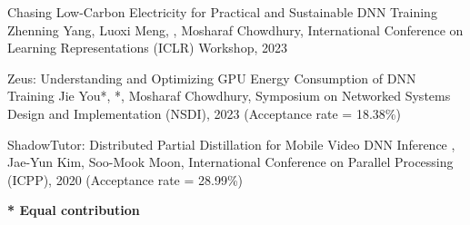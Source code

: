 



\begin{cvlist}

  \cvlistitem
    {Chasing Low-Carbon Electricity for Practical and Sustainable DNN Training} %
    {Zhenning Yang, Luoxi Meng, , Mosharaf Chowdhury, International Conference on Learning Representations (ICLR) Workshop, 2023} %

  \cvlistitem
    {Zeus: Understanding and Optimizing GPU Energy Consumption of DNN Training} %
    {Jie You*, *, Mosharaf Chowdhury, Symposium on Networked Systems Design and Implementation (NSDI), 2023 (Acceptance rate = 18.38\%)} %

  \cvlistitem
    {ShadowTutor: Distributed Partial Distillation for Mobile Video DNN Inference} %
    {, Jae-Yun Kim, Soo-Mook Moon, International Conference on Parallel Processing (ICPP), 2020 (Acceptance rate = 28.99\%)} %

\end{cvlist}

\vspace{-5mm}
\begin{cvparagraph}
  \textbf{* Equal contribution}
\end{cvparagraph}
